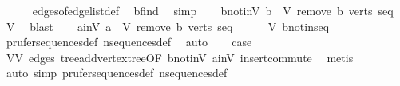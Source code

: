 \begin{isabellebody}
\ \ \ \ \isamarkupfalse%
\ edges{\isacharunderscore}{\kern0pt}of{\isacharunderscore}{\kern0pt}edge{\isacharunderscore}{\kern0pt}list{\isacharunderscore}{\kern0pt}def\ \isamarkupfalse%
\ b{\isacharunderscore}{\kern0pt}find\ \isamarkupfalse%
\ simp\isanewline
\ \ \isamarkupfalse%
\ b{\isacharunderscore}{\kern0pt}notin{\isacharunderscore}{\kern0pt}V{\isacharprime}{\kern0pt}{\isacharcolon}{\kern0pt}\ {\isachardoublequoteopen}b\ {\isasymnotin}\ {\isacharquery}{\kern0pt}V\ {\isacharparenleft}{\kern0pt}remove{}\ b\ verts{\isacharparenright}{\kern0pt}\ seq{\isachardoublequoteclose}\ \isamarkupfalse%
\ V{\isacharprime}{\kern0pt}\ \isamarkupfalse%
\ blast\isanewline
\ \ \isamarkupfalse%
\ a{\isacharunderscore}{\kern0pt}in{\isacharunderscore}{\kern0pt}V{\isacharprime}{\kern0pt}{\isacharcolon}{\kern0pt}\ {\isachardoublequoteopen}a\ {\isasymin}\ {\isacharquery}{\kern0pt}V\ {\isacharparenleft}{\kern0pt}remove{}\ b\ verts{\isacharparenright}{\kern0pt}\ seq{\isachardoublequoteclose}\isanewline
\ \ \ \ \isamarkupfalse%
\ V{\isacharprime}{\kern0pt}\ b{\isacharunderscore}{\kern0pt}notin{\isacharunderscore}{\kern0pt}seq\ {}{\isacharparenleft}{\kern0pt}{}{\isacharparenright}{\kern0pt}\ \isamarkupfalse%
\ prufer{\isacharunderscore}{\kern0pt}sequences{\isacharunderscore}{\kern0pt}def\ n{\isacharunderscore}{\kern0pt}sequences{\isacharunderscore}{\kern0pt}def\ \isamarkupfalse%
\ auto\isanewline
\isanewline
\ \ \isamarkupfalse%
\ {\isacharquery}{\kern0pt}case\ \isamarkupfalse%
\ V{\isacharunderscore}{\kern0pt}V{\isacharprime}{\kern0pt}\ edges\ tree{\isacharprime}{\kern0pt}{\isachardot}{\kern0pt}add{\isacharunderscore}{\kern0pt}vertex{\isacharunderscore}{\kern0pt}tree{\isacharbrackleft}{\kern0pt}OF\ b{\isacharunderscore}{\kern0pt}notin{\isacharunderscore}{\kern0pt}V{\isacharprime}{\kern0pt}\ a{\isacharunderscore}{\kern0pt}in{\isacharunderscore}{\kern0pt}V{\isacharprime}{\kern0pt}{\isacharbrackright}{\kern0pt}\ insert{\isacharunderscore}{\kern0pt}commute\ \isamarkupfalse%
\ metis\isanewline
{}\isamarkupfalse%
\ {\isacharparenleft}{\kern0pt}auto\ simp{\isacharcolon}{\kern0pt}\ prufer{\isacharunderscore}{\kern0pt}sequences{\isacharunderscore}{\kern0pt}def\ n{\isacharunderscore}{\kern0pt}sequences{\isacharunderscore}{\kern0pt}def{\isacharparenright}{\kern0pt}%
\endisatagproof
{\isafoldproof}%
%
\isadelimproof

\end{isabellebody}
